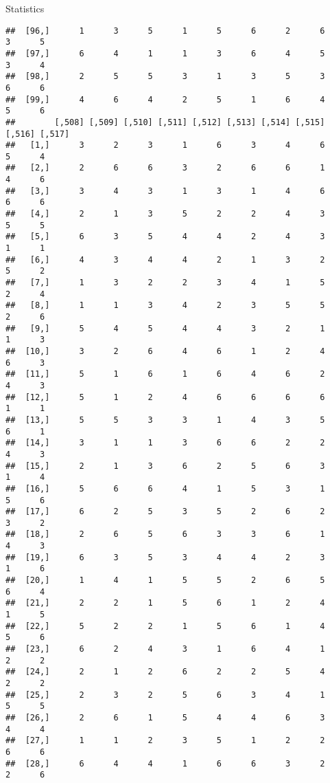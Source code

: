 \documentclass[
  ignorenonframetext,
]{beamer}
\begin{document}
\begin{frame}[fragile]{Statistics}
\begin{verbatim}
##  [96,]      1      3      5      1      5      6      2      6      3      5
##  [97,]      6      4      1      1      3      6      4      5      3      4
##  [98,]      2      5      5      3      1      3      5      3      6      6
##  [99,]      4      6      4      2      5      1      6      4      5      6
##        [,508] [,509] [,510] [,511] [,512] [,513] [,514] [,515] [,516] [,517]
##   [1,]      3      2      3      1      6      3      4      6      5      4
##   [2,]      2      6      6      3      2      6      6      1      4      6
##   [3,]      3      4      3      1      3      1      4      6      6      6
##   [4,]      2      1      3      5      2      2      4      3      5      5
##   [5,]      6      3      5      4      4      2      4      3      1      1
##   [6,]      4      3      4      4      2      1      3      2      5      2
##   [7,]      1      3      2      2      3      4      1      5      2      4
##   [8,]      1      1      3      4      2      3      5      5      2      6
##   [9,]      5      4      5      4      4      3      2      1      1      3
##  [10,]      3      2      6      4      6      1      2      4      6      3
##  [11,]      5      1      6      1      6      4      6      2      4      3
##  [12,]      5      1      2      4      6      6      6      6      1      1
##  [13,]      5      5      3      3      1      4      3      5      6      1
##  [14,]      3      1      1      3      6      6      2      2      4      3
##  [15,]      2      1      3      6      2      5      6      3      1      4
##  [16,]      5      6      6      4      1      5      3      1      5      6
##  [17,]      6      2      5      3      5      2      6      2      3      2
##  [18,]      2      6      5      6      3      3      6      1      4      3
##  [19,]      6      3      5      3      4      4      2      3      1      6
##  [20,]      1      4      1      5      5      2      6      5      6      4
##  [21,]      2      2      1      5      6      1      2      4      1      5
##  [22,]      5      2      2      1      5      6      1      4      5      6
##  [23,]      6      2      4      3      1      6      4      1      2      2
##  [24,]      2      1      2      6      2      2      5      4      2      2
##  [25,]      2      3      2      5      6      3      4      1      5      5
##  [26,]      2      6      1      5      4      4      6      3      4      4
##  [27,]      1      1      2      3      5      1      2      2      6      6
##  [28,]      6      4      4      1      6      6      3      2      2      6

\end{verbatim}
\end{frame}
\end{document}

